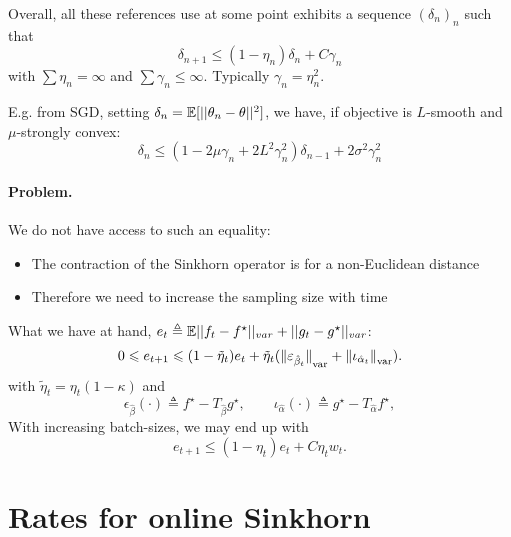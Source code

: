 \documentclass[a4paper, 10pt]{article}
\begin{document}
Overall, all these references use at some point exhibits a sequence $(\delta_n)_n$ such that
\begin{equation}
    \delta_{n+1} \leq (1 - \eta_n) \delta_n + C \gamma_n
\end{equation}
with $\sum \eta_n = \infty$ and $\sum \gamma_n \leq \infty$. Typically $\gamma_n = \eta_n^2$.

E.g. from SGD, setting $\delta_n = \mathbb{E}[|| \theta_n - \theta ||^2]$, we have, if objective is $L$-smooth and $\mu$-strongly convex:
\begin{equation}
    \delta_n \leq (1 - 2 \mu \gamma_n   + 2 L^2 \gamma_n^2) \delta_{n-1} + 2 \sigma^2 \gamma_n^2
\end{equation}


\paragraph{Problem.} We do not have access to such an equality:
\begin{itemize}
    \item The contraction of the Sinkhorn operator is for a non-Euclidean distance
    \item Therefore we need to increase the sampling size with time
\end{itemize}

What we have at hand, $e_t \triangleq \mathbb{E} ||f_t - f^\star||_{var} + ||g_t - g^\star||_{var}$:
\begin{equation}\label{eq:Et_rec}
    0 \leqslant e_{t+1} \leqslant 
    (1 - \tilde \eta_t) e_t
    + \tilde \eta_t
    ({\Vert \varepsilon_{\hat \beta_t} \Vert}_{\text{var}} + 
    {\Vert \iota_{\hat \alpha_t} \Vert}_{\text{var}}).
\end{equation}
with $\tilde \eta_t = \eta_t (1 - \kappa)$ and
\begin{equation}
    \epsilon_{\hat \beta}(\cdot) \triangleq
    f^\star - T_{\hat \beta}{g^\star} ,\qquad
    \iota_{\hat \alpha}(\cdot) \triangleq 
    g^\star - T_{\hat \alpha}{f^\star},
\end{equation}
With increasing batch-sizes, we may end up with
\begin{equation}
    e_{t+1} \leq (1 - \eta_t) e_t + C \eta_t w_t.           
\end{equation}

\section{Rates for online Sinkhorn}
\end{document}
